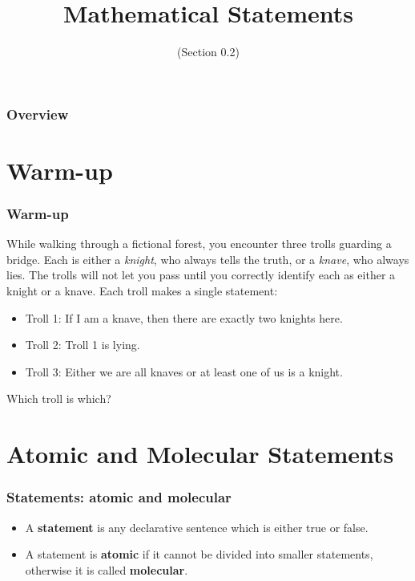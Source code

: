 \documentclass[11pt, compress]{beamer}
\title{Mathematical Statements}
\subtitle{(Section 0.2)}
\author{}
\date[]{}
\newcommand{\terminology}[1]{\textbf{#1}}
\begin{document}
\begin{frame}
\maketitle 
\end{frame}
 
\begin{frame}
\frametitle{Overview}
\tableofcontents 
\end{frame}
 

\section{Warm-up}
\begin{frame}
\frametitle{Warm-up}
 While walking through a fictional forest, you encounter three trolls guarding a bridge. Each is either a \emph{knight}, who always tells the truth, or a \emph{knave}, who always lies. The trolls will not let you pass until you correctly identify each as either a knight or a knave. Each troll makes a single statement:\begin{itemize}
\item{} Troll 1: If I am a knave, then there are exactly two knights here.


\item{} Troll 2: Troll 1 is lying.


\item{} Troll 3: Either we are all knaves or at least one of us is a knight.

\end{itemize}
Which troll is which?
\end{frame}
 


\section{Atomic and Molecular Statements}
\begin{frame}
\frametitle{Statements: atomic and molecular}
 \begin{itemize}
\item{} A \terminology{statement} is any declarative sentence which is either true or false.


\item{} A statement is \terminology{atomic} if it cannot be divided into smaller statements, otherwise it is called \terminology{molecular}.

\end{itemize}

\end{frame}
 
\end{document}
